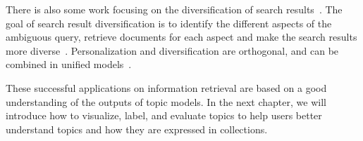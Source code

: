 There is also some work focusing on the diversification of search results~\citep{Dang-2013,Santos-2015}. The goal of search result diversification is to identify the different aspects of the ambiguous query, retrieve documents for each aspect and make the search results more diverse~\citep{Dang-2013}. Personalization and diversification are orthogonal, and can be combined in unified models~\citep{Vallet-2012,Liang-2014}.

These successful applications on information retrieval are based on a good
understanding of the outputs of topic models. In the next chapter, we
will introduce how to visualize, label, and evaluate topics to
help users better understand topics and how they are expressed in collections.
